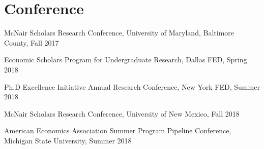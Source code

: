 
\section{Conference} %
\label{sec:conference}
\vspace{-0.25in}
\begin{outerlist}
    \item McNair Scholars Research Conference, University of Maryland, Baltimore County, Fall 2017
    \item Economic Scholars Program for Undergraduate Research, Dallas FED, Spring 2018
    \item Ph.D Excellence Initiative Annual Research Conference, New York FED, Summer 2018
    \item McNair Scholars Research Conference, University of New Mexico, Fall 2018
    \item American Economics Association Summer Program Pipeline Conference, Michigan State University, Summer 2018
\end{outerlist}

